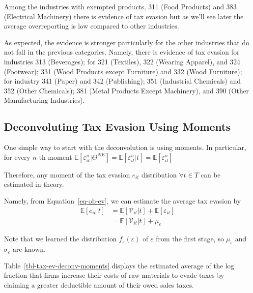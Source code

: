 \documentclass[
  12pt]{article}
\theoremstyle{definition}
\theoremstyle{remark}
\begin{document}
Among the industries with exempted products, 311 (Food Products) and 383
(Electrical Machinery) there is evidence of tax evasion but as we'll see
later the average overreporting is low compared to other industries.

As expected, the evidence is stronger particularly for the other
industries that do not fall in the previous categories. Namely, there is
evidence of tax evasion for industries 313 (Beverages); for 321
(Textiles), 322 (Wearing Apparel), and 324 (Footwear); 331 (Wood
Products except Furniture) and 332 (Wood Furniture); for industry 341
(Paper) and 342 (Publishing); 351 (Industrial Chemicals) and 352 (Other
Chemicals); 381 (Metal Products Except Machinery), and 390 (Other
Manufacturing Industries).

\subsection{Deconvoluting Tax Evasion Using
Moments}\label{deconvoluting-tax-evasion-using-moments}

One simple way to start with the deconvolution is using moments. In
particular, for every \(n\)-th moment
\(\mathbb{E}[\varepsilon_{it}^n|\Theta^{NE}]=\mathbb{E}[\varepsilon_{it}^n|t]=\mathbb{E}[\varepsilon_{it}^n]\)

Therefore, any moment of the tax evasion \(e_{it}\) distribution
\(\forall t\in T\) can be estimated in theory.

Namely, from Equation~\ref{eq-ob-ev}, we can estimate the average tax
evasion by \[
\begin{aligned}
  \mathbb{E}[e_{it}|t]&=\mathbb{E}[\mathcal V_{it}|t]+\mathbb{E}[\varepsilon_{it}]\\
  &=\mathbb{E}[\mathcal V_{it}|t]+\mu_{\varepsilon}
\end{aligned}
\]

Note that we learned the distribution \(f_\varepsilon(\varepsilon)\) of
\(\varepsilon\) from the first stage, so \(\mu_{\varepsilon}\) and
\(\sigma_{\varepsilon}\) are known.

Table~\ref{tbl-tax-ev-deconv-moments} displays the estimated average of
the log fraction that firms increase their costs of raw materials to
evade taxes by claiming a greater deductible amount of their owed sales
taxes.
\end{document}
